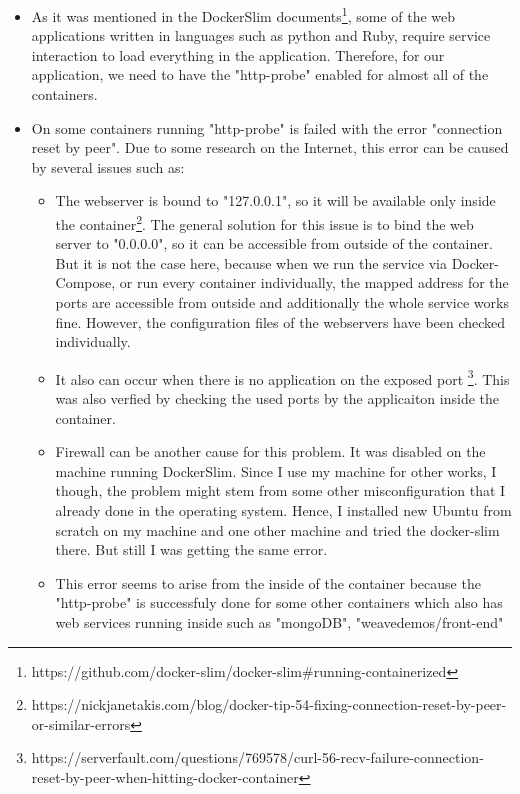 \begin{itemize}
	\item{
	As it was mentioned in the DockerSlim documents\footnote{https://github.com/docker-slim/docker-slim#running-containerized}, some of the web applications written in languages such as python and Ruby, require service interaction to load everything in the application. Therefore, for our application, we need to have the "http-probe" enabled for almost all of the containers. 
	}
	\item{
	On some containers running "http-probe" is failed with the error "connection reset by peer". Due to some research on the Internet, this error can be caused by several issues such as:
	\begin{itemize}
		\item{
		The webserver is bound to "127.0.0.1", so it will be available only inside the container\footnote{https://nickjanetakis.com/blog/docker-tip-54-fixing-connection-reset-by-peer-or-similar-errors}. The general solution for this issue is to bind the web server to "0.0.0.0", so it can be accessible from outside of the container. But it is not the case here, because when we run the service via Docker-Compose, or run every container individually, the mapped address for the ports are accessible from outside and additionally the whole service works fine. However, the configuration files of the webservers have been checked individually.
		}
		\item{ It also can occur when there is no application on the exposed port \footnote{https://serverfault.com/questions/769578/curl-56-recv-failure-connection-reset-by-peer-when-hitting-docker-container}. This was also verfied by checking the used ports by the applicaiton inside the container. 
		
		}
		\item {Firewall can be another cause for this problem. It was disabled on the machine running DockerSlim. Since I use my machine for other works, I though, the problem might stem from some other misconfiguration that I already done in the operating system. Hence, I installed new Ubuntu from scratch on my machine and one other machine and tried the docker-slim there. But still I was getting the same error.}
		
		\item{
		This error seems to arise from the inside of the container because the "http-probe" is successfuly done for some other containers which also has web services running inside such as "mongoDB", "weavedemos/front-end"
		}


\end{itemize}}
\end{itemize}
